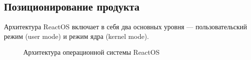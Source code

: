 \subsection{Позиционирование продукта}
Архитектура ReactOS включает в себя два основных уровня — пользовательский режим (user mode) и режим ядра (kernel mode).
\begin{figure}[H]
  \centering
  \caption{Архитектура операционной системы ReactOS}
\end{figure}
